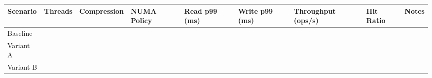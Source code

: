 \documentclass[
  english,
  letterpaper,
  DIV=11,
  numbers=noendperiod]{scrartcl}
\newcounter{none} %
\begin{document}
{\def\LTcaptype{none} %
\begin{longtable}[]{@{}
  >{\raggedright\arraybackslash}p{}
  >{\raggedleft\arraybackslash}p{}
  >{\raggedright\arraybackslash}p{}
  >{\raggedright\arraybackslash}p{}
  >{\raggedleft\arraybackslash}p{}
  >{\raggedleft\arraybackslash}p{}
  >{\raggedleft\arraybackslash}p{}
  >{\raggedleft\arraybackslash}p{}
  >{\raggedright\arraybackslash}p{}@{}}
\toprule\noalign{}
\begin{minipage}[b]{\linewidth}\raggedright
Scenario
\end{minipage} & \begin{minipage}[b]{\linewidth}\raggedleft
Threads
\end{minipage} & \begin{minipage}[b]{\linewidth}\raggedright
Compression
\end{minipage} & \begin{minipage}[b]{\linewidth}\raggedright
NUMA Policy
\end{minipage} & \begin{minipage}[b]{\linewidth}\raggedleft
Read p99 (ms)
\end{minipage} & \begin{minipage}[b]{\linewidth}\raggedleft
Write p99 (ms)
\end{minipage} & \begin{minipage}[b]{\linewidth}\raggedleft
Throughput (ops/s)
\end{minipage} & \begin{minipage}[b]{\linewidth}\raggedleft
Hit Ratio
\end{minipage} & \begin{minipage}[b]{\linewidth}\raggedright
Notes
\end{minipage} \\
\midrule\noalign{}
\endhead
\bottomrule\noalign{}
\endlastfoot
Baseline & & & & & & & & \\
Variant A & & & & & & & & \\
Variant B & & & & & & & & \\
\end{longtable}
}
\end{document}
